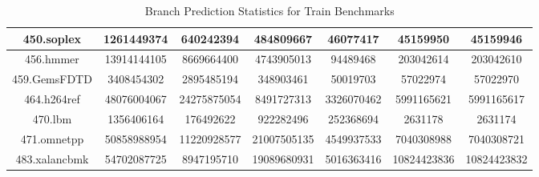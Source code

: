 \documentclass{article}
\begin{document}
\begin{table}[h!]
\begin{tabular}{|c|c|c|c|c|c|c|}
    \hline
    450.soplex &  1261449374 & 640242394 & 484809667 & 46077417 & 45159950 & 45159946 \\    
    \hline
    456.hmmer &  13914144105 & 8669664400 & 4743905013 & 94489468 & 203042614 & 203042610 \\
    \hline
    459.GemsFDTD &  3408454302 & 2895485194 & 348903461 & 50019703 & 57022974 & 57022970 \\
    \hline
    464.h264ref &  48076004067 & 24275875054 & 8491727313 & 3326070462 & 5991165621 & 5991165617 \\
    \hline
    470.lbm &  1356406164 & 176492622 & 922282496 & 252368694 & 2631178 & 2631174 \\
    \hline
    471.omnetpp &  50858988954 & 11220928577 & 21007505135 & 4549937533 & 7040308988 & 7040308721 \\
    \hline
    483.xalancbmk &  54702087725 & 8947195710 & 19089680931 & 5016363416 & 10824423836 & 10824423832 \\
    \hline
    \end{tabular}
    \caption{Branch Prediction Statistics for Train Benchmarks}
\end{table}
\end{document}
